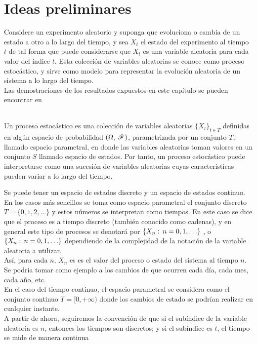\section{Ideas preliminares}
Considere un experimento aleatorio y suponga que evoluciona o cambia de un estado a otro a lo largo del tiempo, y sea $X_t$ el estado del experimento al tiempo $t$ de tal forma que puede considerarse
que $X_t$ es una variable aleatoria para cada valor del índice $t$. Esta colección de variables aleatorias se conoce como proceso estocástico, y sirve como modelo para representar la evolución aleatoria de un sistema a lo largo del tiempo.\\
Las demostraciones de los resultados expuestos en este capítulo se pueden encontrar en\\\\
\begin{Def}
    Un proceso estocástico es una colección de variables aleatorias $\{X_t\}_{t\in T}$ definidas en algún espacio de probabilidad $(\Omega,\thinspace\mathscr{F})$, parametrizada por un conjunto $T$, llamado espacio parametral, en donde las variables aleatorias toman valores en un conjunto $S$ llamado espacio de estados.
    Por tanto, un proceso estocástico puede interpretarse como una sucesión de variables aleatorias cuyas características pueden variar a lo largo del tiempo.
\end{Def}
Se puede tener un espacio de estados discreto y un espacio de estados continuo.
En los casos más sencillos se toma como espacio parametral el conjunto
discreto $T= \{0, 1, 2,\ldots\}$ y estos números se interpretan como tiempos. En este caso se dice que el proceso es a tiempo discreto (también conocido como cadenas), y en general este tipo
de procesos se denotará por $\{X_n:\thinspace n= 0, 1, \ldots\}$ , o $\{X_n:\thinspace n= 0, 1, \ldots\}$ dependiendo de la complejidad de la notación de la variable aleatoria a utilizar.\\Así, para cada $n$, $X_n$ es es el valor del proceso o estado del sistema al tiempo $n$.
Se podría tomar como ejemplo a los cambios de que ocurren cada día, cada mes, cada año, etc.\\ En el caso del tiempo continuo, el espacio parametral se considera como el conjunto continuo $T=[0,+\infty)$ donde los cambios de estado se podrían realizar en cualquier instante.\\
A partir de ahora, seguiremos la convención de que si el subíndice de la variable aleatoria es $n$, entonces los tiempos son discretos; y si el subíndice es $t$, el tiempo se mide de manera continua\\
